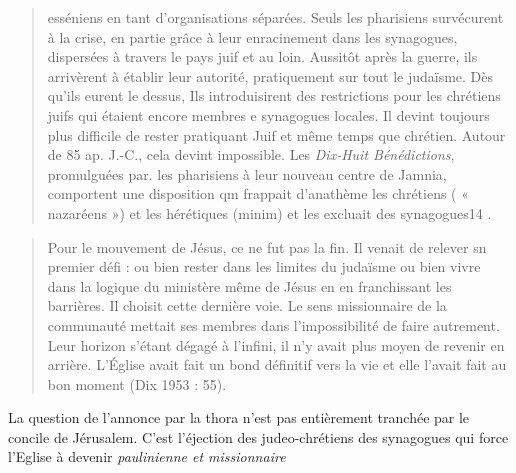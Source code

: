 \begin{quote}
esséniens en tant d'organisations séparées. Seuls les pharisiens
survécurent à la crise, en partie grâce à leur enracinement dans les
synagogues, dispersées à travers le pays juif et au loin. Aussitôt après
la guerre, ils arrivèrent à établir leur autorité, pratiquement sur tout le
judaïsme. Dès qu'ils eurent le dessus, Ils introduisirent des restrictions
pour les chrétiens juifs qui étaient encore membres e synagogues
locales. Il devint toujours plus difficile de rester pratiquant Juif et
même temps que chrétien. Autour de 85 ap. J.-C., cela devint
impossible. Les \textit{Dix-Huit Bénédictions}, promulguées par. les pharisiens
à leur nouveau centre de Jamnia, comportent une disposition qm
frappait d'anathème les chrétiens ( « nazaréens ») et les hérétiques
(minim) et les excluait des synagogues14
. 
\end{quote}

\begin{quote}
    Pour le mouvement de Jésus, ce ne fut pas la fin. Il venait de relever
sn premier défi : ou bien rester dans les limites du judaïsme ou bien
vivre dans la logique du ministère même de Jésus en en franchissant
les barrières. Il choisit cette dernière voie. Le sens missionnaire de la
communauté mettait ses membres dans l'impossibilité de faire autrement.
Leur horizon s'étant dégagé à l'infini, il n'y avait plus moyen
de revenir en arrière. L'Église avait fait un bond définitif vers la vie et
elle l'avait fait au bon moment (Dix 1953 : 55).
    
\end{quote}
\begin{Synthesis}
La question de l'annonce par la thora n'est pas entièrement tranchée par le concile de Jérusalem. C'est l'éjection des judeo-chrétiens des synagogues qui force l'Eglise à devenir \textit{paulinienne et missionnaire}
\end{Synthesis}

